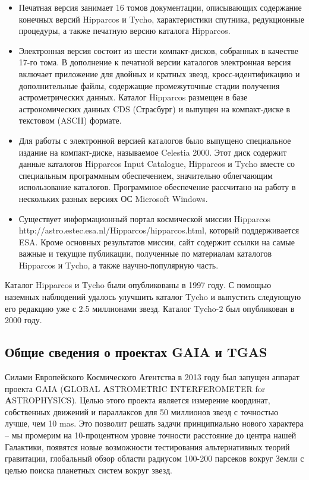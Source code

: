 \documentclass[14pt]{article} %
\begin{document}
\begin{itemize}

\item Печатная версия занимает 16 томов документации, описывающих содержание конечных версий Hipparcos и Tycho, характеристики спутника, редукционные процедуры, а также печатную версию каталога Hipparcos.

\item Электронная версия состоит из шести компакт-дисков, собранных в качестве 17-го тома. В дополнение к печатной версии каталогов электронная версия включает приложение для двойных и кратных звезд, кросс-идентификацию и дополнительные файлы, содержащие промежуточные стадии получения астрометрических данных. Каталог Hipparcos размещен в базе астрономических данных CDS (Страсбург) и выпущен на компакт-диске в текстовом (ASCII) формате.

\item Для работы с электронной версией каталогов было выпущено специальное издание на компакт-диске, называемое Celestia 2000. Этот диск содержит данные каталогов Hipparcos Input Catalogue, Hipparcos и Tycho вместе со специальным программным обеспечением, значительно облегчающим использование каталогов. Программное обеспечение рассчитано на работу в нескольких разных версиях ОС Microsoft Windows.

\item Существует информационный портал космической миссии Hipparcos http://astro.estec.esa.nl/Hipparcos/hipparcos.html, который поддерживается ESA. Кроме основных результатов миссии, сайт содержит ссылки на самые важные и текущие публикации, полученные по материалам каталогов Hipparcos и Tycho, а также научно-популярную часть.

\end{itemize}

Каталог Hipparcos и Tycho были опубликованы в 1997 году. С помощью наземных наблюдений удалось улучшить каталог Tycho и выпустить следующую его редакцию уже с 2.5 миллионами звезд. Каталог Tycho-2 был опубликован в 2000 году.

\subsection{Общие сведения о проектах GAIA и TGAS}\label{sub:smthgaia}

Силами Европейского Космического Агентства в 2013 году был запущен  аппарат проекта GAIA (\textbf{G}LOBAL \textbf{A}STROMETRIC \textbf{I}NTERFEROMETER for \textbf{A}STROPHYSICS). Целью этого проекта является измерение координат, собственных движений и параллаксов для 50 миллионов звезд с точностью лучше, чем 10 mas. Это позволит решать задачи принципиально нового характера -- мы промерим на 10-процентном уровне точности расстояние до центра нашей Галактики, появятся новые возможности тестирования альтернативных теорий гравитации, глобальный обзор области радиусом 100-200 парсеков вокруг Земли с целью поиска планетных систем вокруг звезд.
\end{document}

